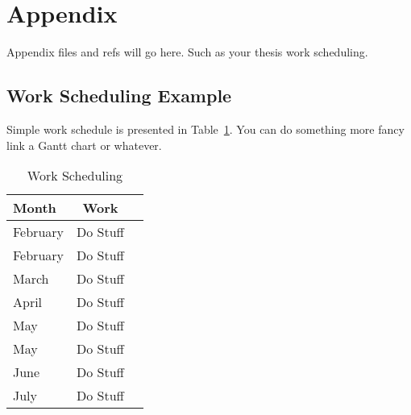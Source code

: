 
\section{Appendix} %
\label{sec:attachments}

Appendix files and refs will go here.
Such as your thesis work scheduling. 

\subsection{Work Scheduling Example} %
\label{sub:work_scheduling}
Simple work schedule is presented in Table~\ref{tab:worktable}. You can do something more fancy link a Gantt chart or whatever.
\begin{table}[H]
  \caption{Work Scheduling}
  \label{tab:worktable}
  \begin{center}
    \begin{tabular}{l|cc}
    \hline

    \hline
    \textbf{Month} & \textbf{Work} \\
    \hline
      February & Do Stuff \\
    \hline
      February & Do Stuff \\
    \hline
      March & Do Stuff   \\
    \hline
      April & Do Stuff   \\
    \hline
      May & Do Stuff   \\
    \hline
      May & Do Stuff   \\
    \hline
      June & Do Stuff   \\
    \hline
      July & Do Stuff   \\
    \hline

    \hline
    \end{tabular}
  \end{center}
\end{table}